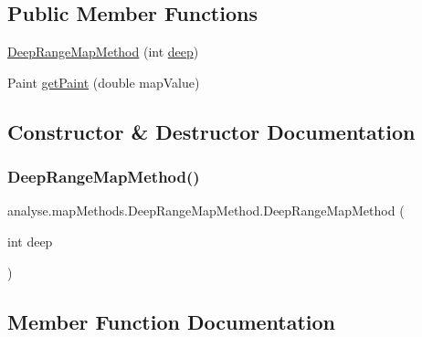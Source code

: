 \subsection*{Public Member Functions}
\begin{DoxyCompactItemize}
\item 
\mbox{\hyperlink{classanalyse_1_1map_methods_1_1_deep_range_map_method_aac249ba9748248b6248425c2ee92e31c}{Deep\+Range\+Map\+Method}} (int \mbox{\hyperlink{classanalyse_1_1map_methods_1_1_abstract_deep_map_method_a90ee3a39a212a9cc99f22913cc8809a5}{deep}})
\item 
Paint \mbox{\hyperlink{classanalyse_1_1map_methods_1_1_deep_range_map_method_ac8f545e244fb4bb2fe446f23c5969976}{get\+Paint}} (double map\+Value)
\end{DoxyCompactItemize}


\subsection{Constructor \& Destructor Documentation}
\mbox{\label{classanalyse_1_1map_methods_1_1_deep_range_map_method_aac249ba9748248b6248425c2ee92e31c}} 
\subsubsection{\texorpdfstring{Deep\+Range\+Map\+Method()}{DeepRangeMapMethod()}}
{\footnotesize\ttfamily analyse.\+map\+Methods.\+Deep\+Range\+Map\+Method.\+Deep\+Range\+Map\+Method (\begin{DoxyParamCaption}\item[{int}]{deep }\end{DoxyParamCaption})\hspace{0.3cm}{\ttfamily [inline]}}



\subsection{Member Function Documentation}
\mbox{\label{classanalyse_1_1map_methods_1_1_deep_range_map_method_ac8f545e244fb4bb2fe446f23c5969976}} 
